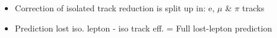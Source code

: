 \documentclass{beamer}
\begin{document}
\begin{frame}
\begin{columns}
\begin{column}{0.50\textwidth}
   
 \end{column}
 \begin{column}{0.50\textwidth}
\begin{center}
 \end{center}
 \end{column} 
 \end{columns}
 \begin{itemize}
  \item Correction of isolated track reduction is split up in: e, $\mu$ \& $\pi$ tracks
  \item Prediction lost iso. lepton - iso track eff. = Full lost-lepton prediction
 \end{itemize}

\end{frame}
\end{document}
